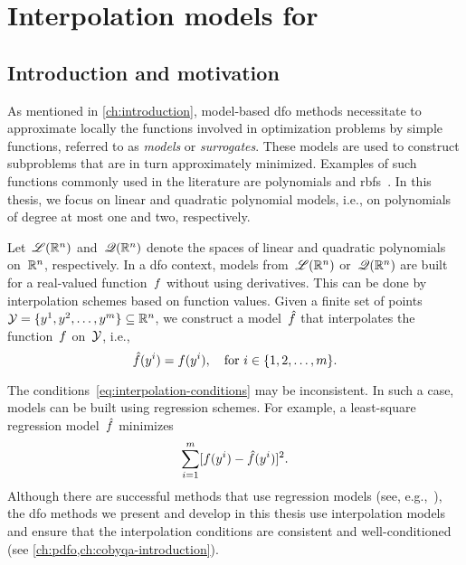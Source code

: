 %
%
%
\chapter{Interpolation models for }
\label{ch:interpolation}

\section{Introduction and motivation}

As mentioned in \cref{ch:introduction}, model-based \gls{dfo} methods necessitate to approximate locally the functions involved in optimization problems by simple functions, referred to as \emph{models} or \emph{surrogates}.
These models are used to construct subproblems that are in turn approximately minimized.
Examples of such functions commonly used in the literature are polynomials and \glspl{rbf}~\cite{Powell_2004a}.
In this thesis, we focus on linear and quadratic polynomial models, i.e., on polynomials of degree at most one and two, respectively.

Let~$\mathscr{L}(\mathbb{R}^n)$ and~$\mathscr{Q}(\mathbb{R}^n)$ denote the spaces of linear and quadratic polynomials on~$\mathbb{R}^n$, respectively.
In a \gls{dfo} context, models from~$\mathscr{L}(\mathbb{R}^n)$ or~$\mathscr{Q}(\mathbb{R}^n)$ are built for a real-valued function~$f$ without using derivatives.
This can be done by interpolation schemes based on function values.
Given a finite set of points~$\xpt = \set{y^1, y^2, \dots, y^m} \subseteq \R^n$, we construct a model~$\objm$ that interpolates the function~$f$ on~$\xpt$, i.e.,
\begin{equation}
    \label{eq:interpolation-conditions}
    \objm(y^i) = \obj(y^i), \quad \text{for~$i \in \set{1, 2, \dots, m}$}.
\end{equation}

The conditions~\cref{eq:interpolation-conditions} may be inconsistent.
In such a case, models can be built using regression schemes.
For example, a least-square regression model~$\objm$ minimizes
\begin{equation*}
    \sum_{i = 1}^m [\obj(y^i) - \objm(y^i)]^2.
\end{equation*}
Although there are successful methods that use regression models (see, e.g.,~\cite{Billups_Larson_Graf_2013,Conn_Scheinberg_Vicente_2008b}), the \gls{dfo} methods we present and develop in this thesis use interpolation models and ensure that the interpolation conditions are consistent and well-conditioned (see \cref{ch:pdfo,ch:cobyqa-introduction}).

